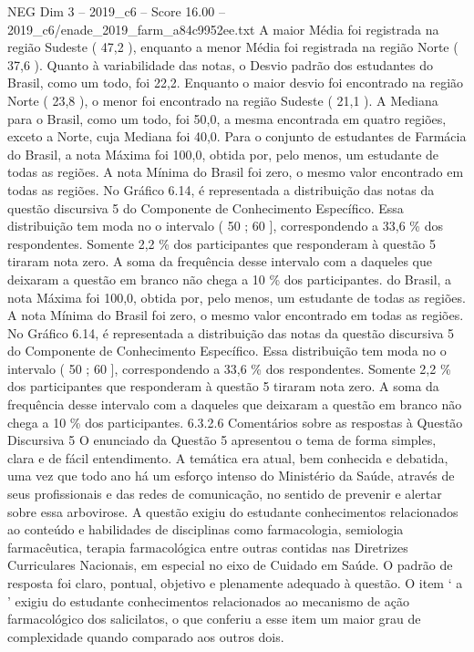 \begin{textsample}{NEG Dim 3 – 2019\_c6 – Score 16.00 – 2019\_c6/enade\_2019\_farm\_a84c9952ee.txt}
A maior Média foi registrada na região Sudeste ( 47,2 ), enquanto a menor Média foi registrada na região Norte ( 37,6 ).
Quanto à variabilidade das notas, o Desvio padrão dos estudantes do Brasil, como um todo, foi 22,2.
Enquanto o maior desvio foi encontrado na região Norte ( 23,8 ), o menor foi encontrado na região Sudeste ( 21,1 ).
A Mediana para o Brasil, como um todo, foi 50,0, a mesma encontrada em quatro regiões, exceto a Norte, cuja Mediana foi 40,0.
Para o conjunto de estudantes de Farmácia do Brasil, a nota Máxima foi 100,0, obtida por, pelo menos, um estudante de todas as regiões.
A nota Mínima do Brasil foi zero, o mesmo valor encontrado em todas as regiões.
No Gráfico 6.14, é representada a distribuição das notas da questão discursiva 5 do Componente de Conhecimento Específico.
Essa distribuição tem moda no o intervalo ( 50 ; 60 ], correspondendo a 33,6 \% dos respondentes.
Somente 2,2 \% dos participantes que responderam à questão 5 tiraram nota zero.
A soma da frequência desse intervalo com a daqueles que deixaram a questão em branco não chega a 10 \% dos participantes. do Brasil, a nota Máxima foi 100,0, obtida por, pelo menos, um estudante de todas as regiões.
A nota Mínima do Brasil foi zero, o mesmo valor encontrado em todas as regiões.
No Gráfico 6.14, é representada a distribuição das notas da questão discursiva 5 do Componente de Conhecimento Específico.
Essa distribuição tem moda no o intervalo ( 50 ; 60 ], correspondendo a 33,6 \% dos respondentes.
Somente 2,2 \% dos participantes que responderam à questão 5 tiraram nota zero.
A soma da frequência desse intervalo com a daqueles que deixaram a questão em branco não chega a 10 \% dos participantes. 6.3.2.6 Comentários sobre as respostas à Questão Discursiva 5 O enunciado da Questão 5 apresentou o tema de forma simples, clara e de fácil entendimento.
A temática era atual, bem conhecida e debatida, uma vez que todo ano há um esforço intenso do Ministério da Saúde, através de seus profissionais e das redes de comunicação, no sentido de prevenir e alertar sobre essa arbovirose.
A questão exigiu do estudante conhecimentos relacionados ao conteúdo e habilidades de disciplinas como farmacologia, semiologia farmacêutica, terapia farmacológica entre outras contidas nas Diretrizes Curriculares Nacionais, em especial no eixo de Cuidado em Saúde.
O padrão de resposta foi claro, pontual, objetivo e plenamente adequado à questão.
O item ‘ a ’ exigiu do estudante conhecimentos relacionados ao mecanismo de ação farmacológico dos salicilatos, o que conferiu a esse item um maior grau de complexidade quando comparado aos outros dois.

\end{textsample}
